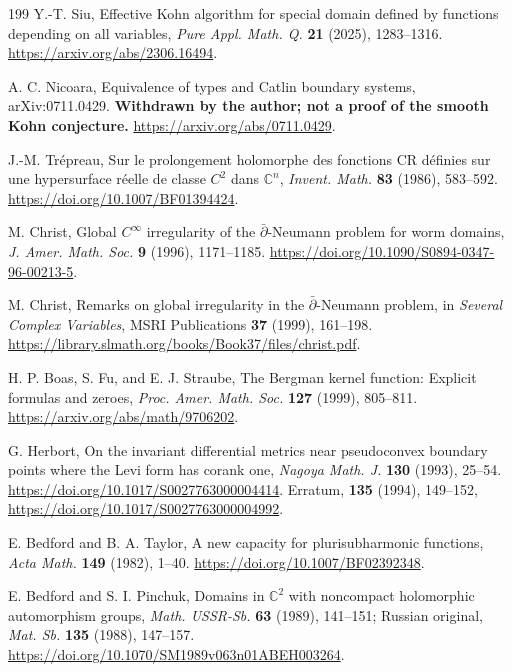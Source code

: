 \documentclass[11pt,reqno]{amsart}
\theoremstyle{definition}
\theoremstyle{remark}
\begin{document}
\begin{thebibliography}{199}
 Y.-T. Siu, Effective Kohn algorithm for special domain defined by functions depending on all variables, \emph{Pure Appl. Math. Q.} \textbf{21} (2025), 1283--1316. \url{https://arxiv.org/abs/2306.16494}.

 A. C. Nicoara, Equivalence of types and Catlin boundary systems, arXiv:0711.0429. \textbf{Withdrawn by the author; not a proof of the smooth Kohn conjecture.} \url{https://arxiv.org/abs/0711.0429}.

 J.-M. Tr\'epreau, Sur le prolongement holomorphe des fonctions CR d\'efinies sur une hypersurface r\'eelle de classe $C^2$ dans $\mathbb C^n$, \emph{Invent. Math.} \textbf{83} (1986), 583--592. \url{https://doi.org/10.1007/BF01394424}.

 M. Christ, Global $C^\infty$ irregularity of the $\bar\partial$-Neumann problem for worm domains, \emph{J. Amer. Math. Soc.} \textbf{9} (1996), 1171--1185. \url{https://doi.org/10.1090/S0894-0347-96-00213-5}.

 M. Christ, Remarks on global irregularity in the $\bar\partial$-Neumann problem, in \emph{Several Complex Variables}, MSRI Publications \textbf{37} (1999), 161--198. \url{https://library.slmath.org/books/Book37/files/christ.pdf}.

 H. P. Boas, S. Fu, and E. J. Straube, The Bergman kernel function: Explicit formulas and zeroes, \emph{Proc. Amer. Math. Soc.} \textbf{127} (1999), 805--811. \url{https://arxiv.org/abs/math/9706202}.

 G. Herbort, On the invariant differential metrics near pseudoconvex boundary points where the Levi form has corank one, \emph{Nagoya Math. J.} \textbf{130} (1993), 25--54. \url{https://doi.org/10.1017/S0027763000004414}. Erratum, \textbf{135} (1994), 149--152, \url{https://doi.org/10.1017/S0027763000004992}.

 E. Bedford and B. A. Taylor, A new capacity for plurisubharmonic functions, \emph{Acta Math.} \textbf{149} (1982), 1--40. \url{https://doi.org/10.1007/BF02392348}.

 E. Bedford and S. I. Pinchuk, Domains in $\mathbb C^2$ with noncompact holomorphic automorphism groups, \emph{Math. USSR-Sb.} \textbf{63} (1989), 141--151; Russian original, \emph{Mat. Sb.} \textbf{135} (1988), 147--157. \url{https://doi.org/10.1070/SM1989v063n01ABEH003264}.


\end{thebibliography}
\end{document}
